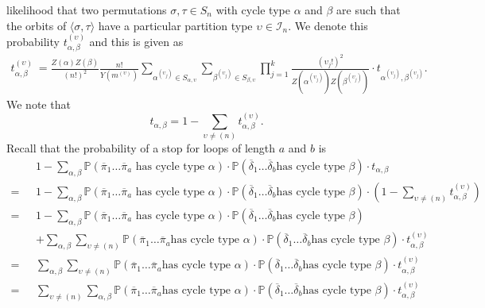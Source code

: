 likelihood that two permutations $\sigma,\tau\in S_n$ with cycle type
$\alpha$ and $\beta$ are such that the orbits of
$\langle\sigma,\tau\rangle$ have a particular partition type
$\upsilon\in\mathcal{I}_n$. We
denote this probability $t_{\alpha,\beta}^{(\upsilon)}$ and this is given as
\begin{align*}
  t_{\alpha,\beta}^{(\upsilon)}\ =\frac{Z(\alpha)Z(\beta)}{(n!)^2}\frac{n!}{Y(m^{(\upsilon)})}\sum_{\alpha^{(\upsilon_j)}\in
  S_{\alpha,\upsilon}}\sum_{\beta^{(\upsilon_j)}\in
  S_{\beta,\upsilon}}\prod_{j=1}^k
  {\frac{(\upsilon_j!)^2}{Z(\alpha^{(\upsilon_j)})Z(\beta^{(\upsilon_j)})}}\cdot
  t_{\alpha^{(\upsilon_j)},\beta^{(\upsilon_j)}}.
\end{align*}
We note that
\[
  t_{\alpha,\beta} = 1 -
  \sum_{\upsilon\ne(n)}t_{\alpha,\beta}^{(\upsilon)}.
\]
Recall that the probability of a stop for loops of length $a$ and $b$ is
\begin{align*}
  &1-\sum_{\alpha,
  \beta}\mathbb{P}(\overline\pi_1\dots\overline\pi_a\text{ has cycle
      type
  }\alpha)\cdot\mathbb{P}(\overline\delta_1\dots\overline\delta_b\text{
  has cycle type }\beta)\cdot t_{\alpha, \beta}\\
  = \text{ }&1-\sum_{\alpha,
  \beta}\mathbb{P}(\overline\pi_1\dots\overline\pi_a\text{ has cycle
      type
  }\alpha)\cdot\mathbb{P}(\overline\delta_1\dots\overline\delta_b\text{
  has cycle type }\beta)\cdot (1 -
  \sum_{\upsilon\ne(n)}t_{\alpha,\beta}^{(\upsilon)})\\
  = \text{ }&1-\sum_{\alpha,
  \beta}\mathbb{P}(\overline\pi_1\dots\overline\pi_a\text{ has cycle
      type
  }\alpha)\cdot\mathbb{P}(\overline\delta_1\dots\overline\delta_b\text{
  has cycle type }\beta)
  \\\text{ }&+
  \sum_{\alpha,\beta}\sum_{\upsilon\ne(n)}\mathbb{P}(\overline\pi_1\dots\overline\pi_a\text{
      has cycle type
  }\alpha)\cdot\mathbb{P}(\overline\delta_1\dots\overline\delta_b\text{
  has cycle type }\beta)\cdot t_{\alpha,\beta}^{(\upsilon)}\\
  =\text{
  }&\sum_{\alpha,\beta}\sum_{\upsilon\ne(n)}\mathbb{P}(\overline\pi_1\dots\overline\pi_a\text{
      has cycle type
  }\alpha)\cdot\mathbb{P}(\overline\delta_1\dots\overline\delta_b\text{
  has cycle type }\beta)\cdot t_{\alpha,\beta}^{(\upsilon)}\\
  =\text{
  }&\sum_{\upsilon\ne(n)}\sum_{\alpha,\beta}\mathbb{P}(\overline\pi_1\dots\overline\pi_a\text{
      has cycle type
  }\alpha)\cdot\mathbb{P}(\overline\delta_1\dots\overline\delta_b\text{
  has cycle type }\beta)\cdot t_{\alpha,\beta}^{(\upsilon)}
\end{align*}
